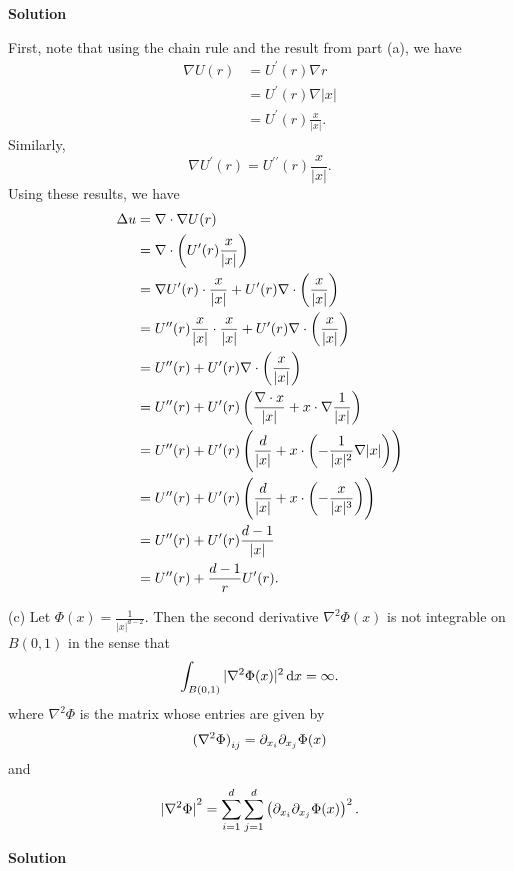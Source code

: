 \documentclass{article}
\begin{document}
\textbf{Solution}

First, note that using the chain rule and the result from part (a), we
have
%
\begin{align*}
    \nabla U(r)
        &= U^\prime(r) \nabla r \\
        &= U^\prime(r) \nabla |x| \\
        &= U^\prime(r) \frac{x}{|x|}
        .
\end{align*}
%
Similarly,
%
\begin{equation*}
    \nabla U^\prime(r) = U^{\prime \prime}(r) \frac{x}{|x|}
    .
\end{equation*}
%
Using these results, we have
%
\begin{align*}
    \Delta u
        &= \nabla \cdot \nabla U(r) \\
        &= \nabla \cdot \del{U^\prime(r) \frac{x}{|x|}} \\
        &= \nabla U^\prime(r) \cdot \frac{x}{|x|} + U^\prime(r) \nabla \cdot \del{\frac{x}{|x|}}\\
        &= U^{\prime \prime}(r) \frac{x}{|x|} \cdot \frac{x}{|x|}
            + U^\prime(r) \nabla \cdot \del{\frac{x}{|x|}} \\
        &= U^{\prime \prime}(r) + U^\prime(r) \nabla \cdot \del{\frac{x}{|x|}} \\
        &= U^{\prime \prime}(r) + U^\prime(r)
            \del{\frac{\nabla \cdot x}{|x|} + x \cdot \nabla\frac{1}{|x|}} \\
        &= U^{\prime \prime}(r) + U^\prime(r)
            \del{\frac{d}{|x|} + x \cdot \del{-\frac{1}{|x|^2} \nabla |x|}} \\
        &= U^{\prime \prime}(r) + U^\prime(r)
            \del{\frac{d}{|x|} + x \cdot \del{-\frac{x}{|x|^3}}} \\
        &= U^{\prime \prime}(r) + U^\prime(r) \frac{d - 1}{|x|} \\
        &= U^{\prime \prime}(r) + \frac{d - 1}{r} U^\prime(r)
        .
\end{align*}

\vspace{5mm}

(c) Let $\Phi(x) = \frac{1}{|x|^{d-2}}$. Then the second derivative
$\nabla^2 \Phi(x)$ is not integrable on $B(0, 1)$ in the sense that
%
\begin{equation*}
    \int_{B(0, 1)} |\nabla^2 \Phi(x)|^2 \dif x = \infty.
\end{equation*}
%
where $\nabla^2 \Phi$ is the matrix whose entries are given by
%
\begin{equation*}
    \del[0]{\nabla^2 \Phi}_{ij} = \partial_{x_i} \partial_{x_j} \Phi(x)
\end{equation*}
%
and
%
\begin{equation*}
    \envert[0]{\nabla^2 \Phi}^2
        = \sum_{i=1}^d \sum_{j=1}^d \del{\partial_{x_i} \partial_{x_j} \Phi(x)}^2
    .
\end{equation*}

\textbf{Solution}
\end{document}
